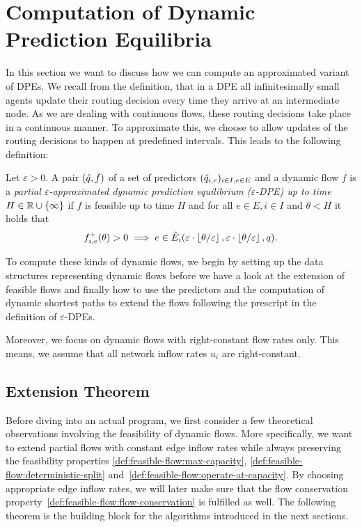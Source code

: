 \section{Computation of Dynamic Prediction Equilibria}\label{sec:compute-dpes}

In this section we want to discuss how we can compute an approximated variant of DPEs.
We recall from the definition, that in a DPE all infinitesimally small agents update their routing decision every time they arrive at an intermediate node.
As we are dealing with continuous flows, these routing decisions take place in a continuous manner.
To approximate this, we choose to allow updates of the routing decisions to happen at predefined intervals.
This leads to the following definition:

\begin{definition}
    Let $\varepsilon > 0$.
    A pair $(\hat q, f)$ of a set of predictors $(\hat q_{i,e})_{i\in I, e\in E}$ and a dynamic flow $f$ is a \emph{partial $\varepsilon$-approximated dynamic prediction equilibrium ($\varepsilon$-DPE) up to time $H\in\mathbb{R}\cup\{\infty\}$} if $f$ is feasible up to time $H$ and for all $e\in E, i\in I$ and $\theta < H$ it holds that
    \[
        {f}^+_{i,e}(\theta) > 0 \implies e \in \hat E_i(\varepsilon\cdot \left\lfloor{\theta / \varepsilon}\right\rfloor, \varepsilon\cdot \left\lfloor{\theta / \varepsilon}\right\rfloor, q).
    \]
\end{definition}

To compute these kinds of dynamic flows, we begin by setting up the data structures representing dynamic flows before we have a look at the extension of feasible flows and finally how to use the predictors and the computation of dynamic shortest paths to extend the flows following the prescript in the definition of $\varepsilon$-DPEs.

Moreover, we focus on dynamic flows with right-constant flow rates only.
This means, we assume that all network inflow rates $u_i$ are right-constant.

\subsection{Extension Theorem}

Before diving into an actual program, we first consider a few theoretical observations involving the feasibility of dynamic flows.
More specifically, we want to extend partial flows with constant edge inflow rates while always preserving the feasibility properties \ref{def:feasible-flow:max-capacity}, \ref{def:feasible-flow:deterministic-split} and~\ref{def:feasible-flow:operate-at-capacity}.
By choosing appropriate edge inflow rates, we will later make sure that the flow conservation property~\ref{def:feasible-flow:flow-conservation} is fulfilled as well. 
The following theorem is the building block for the algorithms introduced in the next sections.

